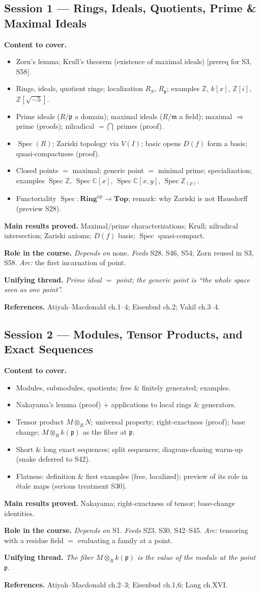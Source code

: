 \documentclass[11pt,a4paper]{article}
\newcommand{\sess}[2]{\subsection[#1. #2]{Session #1 --- #2}}
\newcommand{\chead}{\par\smallskip\noindent\textbf{Content to cover.}}
\newcommand{\proved}[1]{\par\smallskip\noindent\textbf{Main results proved.} #1}
\newcommand{\role}[1]{\par\smallskip\noindent\textbf{Role in the course.} #1}
\newcommand{\thread}[1]{\par\smallskip\noindent\textbf{Unifying thread.} \textit{#1}}
\newcommand{\srefs}[1]{\par\smallskip\noindent\textbf{References.} #1}
\newcommand{\Z}{\mathbb{Z}}
\newcommand{\C}{\mathbb{C}}
\newcommand{\Spec}{\operatorname{Spec}}
\newcommand{\p}{\mathfrak{p}}
\newcommand{\m}{\mathfrak{m}}
\begin{document}
	\sess{1}{Rings, Ideals, Quotients, Prime \& Maximal Ideals}
	\chead
	\begin{itemize}
		\item Zorn's lemma; Krull's theorem (existence of maximal ideals) [prereq for S3, S58].
		\item Rings, ideals, quotient rings; localization $R_S$, $R_\p$; examples $\Z$, $k[x]$, $\Z[i]$, $\Z[\sqrt{-5}]$.
		\item Prime ideals ($R/\p$ a domain); maximal ideals ($R/\m$ a field); maximal $\Rightarrow$ prime (proofs); nilradical $=\bigcap$ primes (proof).
		\item $\Spec(R)$; Zariski topology via $V(I)$; basic opens $D(f)$ form a basis; quasi-compactness (proof).
		\item Closed points $=$ maximal; generic point $=$ minimal prime; specialization; examples $\Spec\Z$, $\Spec\C[x]$, $\Spec\C[x,y]$, $\Spec\Z_{(p)}$.
		\item Functoriality $\Spec:\mathbf{Ring}^{\mathrm{op}}\to\mathbf{Top}$; remark: why Zariski is not Hausdorff (preview S28).
	\end{itemize}
	\proved{Maximal/prime characterizations; Krull; nilradical intersection; Zariski axioms; $D(f)$ basis; $\Spec$ quasi-compact.}
	\role{\emph{Depends on} none. \emph{Feeds} S28, S46, S54; Zorn reused in S3, S58. \emph{Arc:} the first incarnation of point.}
	\thread{Prime ideal $=$ point; the generic point is ``the whole space seen as one point''.}
	\srefs{Atiyah--Macdonald ch.1--4; Eisenbud ch.2; Vakil ch.3--4.}
	
	\sess{2}{Modules, Tensor Products, and Exact Sequences}
	\chead
	\begin{itemize}
		\item Modules, submodules, quotients; free \& finitely generated; examples.
		\item Nakayama's lemma (proof) + applications to local rings \& generators.
		\item Tensor product $M\otimes_R N$; universal property; right-exactness (proof); base change; $M\otimes_R k(\p)$ as the fiber at $\p$.
		\item Short \& long exact sequences; split sequences; diagram-chasing warm-up (snake deferred to S42).
		\item Flatness: definition \& first examples (free, localized); preview of its role in \'etale maps (serious treatment S30).
	\end{itemize}
	\proved{Nakayama; right-exactness of tensor; base-change identities.}
	\role{\emph{Depends on} S1. \emph{Feeds} S23, S30, S42--S45. \emph{Arc:} tensoring with a residue field $=$ evaluating a family at a point.}
	\thread{The fiber $M\otimes_R k(\p)$ is the value of the module at the point $\p$.}
	\srefs{Atiyah--Macdonald ch.2--3; Eisenbud ch.1,6; Lang ch.XVI.}
	
\end{document}
